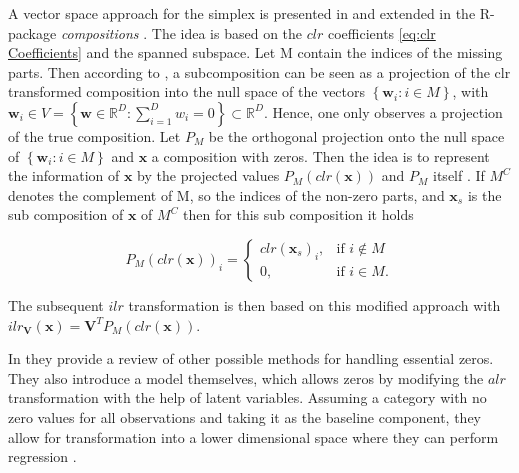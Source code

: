A vector space approach for the simplex is presented in \cite{Boogaart:2006} and extended in the R-package \textit{compositions} \cite{Compositions:2023}. The idea is based on the $clr$ coefficients \ref{eq:clr Coefficients} and the spanned subspace. Let M contain the indices of the missing parts. Then according to \cite{Egozcue:2005}, a subcomposition can be seen as a projection of the clr transformed composition into the null space of the vectors $\left\{\bm{w}_i: i \in M\right\}$, with $\bm{w}_i \in V = \left\{\textbf{w} \in \mathbb{R}^D: \sum_{i=1}^D w_i=0\right\} \subset \mathbb{R}^D$. Hence, one only observes a projection of the true composition. Let $P_M$ be the orthogonal projection onto the null space of $\left\{\bm{w}_i: i \in M\right\}$ and $\bm{x}$ a composition with zeros. Then the idea is to represent the information of $\bm{x}$ by the projected values $P_M(clr(\bm{x}))$ and $P_M$ itself \cite{Boogaart:2006}. If $M^C$ denotes the complement of M, so the indices of the non-zero parts, and $\bm{x}_s$ is the sub composition of $\bm{x}$ of $M^C$ then for this sub composition it holds 

\begin{equation}
P_M(clr(\bm{x}))_i =
\begin{cases}
clr(\bm{x}_s)_i, & \text{if } i \notin M \\
0, & \text{if } i \in M.
\end{cases}
\label{eq:clr Projection}
\end{equation}

The subsequent $ilr$ transformation is then based on this modified approach with $ ilr_{\textbf{V}}(\textbf{x}) = \textbf{V}^T P_M(clr(\textbf{x}))$.

In \cite{Leininger:2013} they provide a review of other possible methods for handling essential zeros. They also introduce a model themselves, which allows zeros by modifying the $alr$ transformation with the help of latent variables. Assuming a category with no zero values for all observations and taking it as the baseline component, they allow for transformation into a lower dimensional space where they can perform regression \cite{Leininger:2013}.


